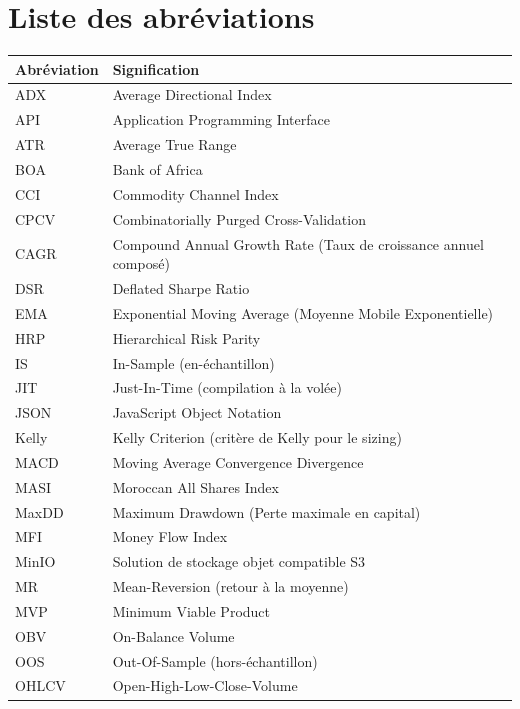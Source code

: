 \chapter*{Liste des abréviations}
\thispagestyle{plain}

\begin{longtable}{@{}ll@{}}
\toprule
\textbf{Abréviation} & \textbf{Signification} \\
\midrule
\endhead
ADX   & Average Directional Index \\
API   & Application Programming Interface \\
ATR   & Average True Range \\
BOA   & Bank of Africa \\
CCI   & Commodity Channel Index \\
CPCV  & Combinatorially Purged Cross-Validation \\
CAGR  & Compound Annual Growth Rate (Taux de croissance annuel composé) \\
DSR   & Deflated Sharpe Ratio \\
EMA   & Exponential Moving Average (Moyenne Mobile Exponentielle) \\
HRP   & Hierarchical Risk Parity \\
IS    & In-Sample (en-échantillon) \\
JIT   & Just-In-Time (compilation à la volée) \\
JSON  & JavaScript Object Notation \\
Kelly & Kelly Criterion (critère de Kelly pour le sizing) \\
MACD  & Moving Average Convergence Divergence \\
MASI  & Moroccan All Shares Index \\
MaxDD & Maximum Drawdown (Perte maximale en capital) \\
MFI   & Money Flow Index \\
MinIO & Solution de stockage objet compatible S3 \\
MR    & Mean-Reversion (retour à la moyenne) \\
MVP   & Minimum Viable Product \\
OBV   & On-Balance Volume \\
OOS   & Out-Of-Sample (hors-échantillon) \\
OHLCV & Open-High-Low-Close-Volume \\

\end{longtable}
